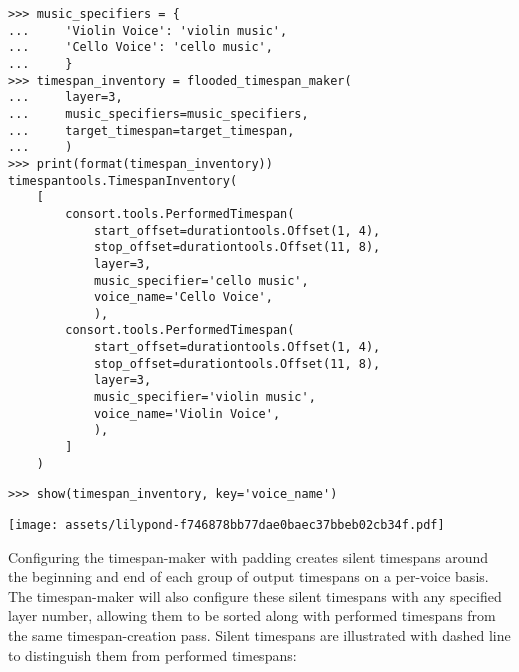\begin{singlespacing}
\vspace{-0.5\baselineskip}
\begin{lstlisting}
>>> music_specifiers = {
...     'Violin Voice': 'violin music',
...     'Cello Voice': 'cello music',
...     }
>>> timespan_inventory = flooded_timespan_maker(
...     layer=3,
...     music_specifiers=music_specifiers,
...     target_timespan=target_timespan,
...     )
>>> print(format(timespan_inventory))
timespantools.TimespanInventory(
    [
        consort.tools.PerformedTimespan(
            start_offset=durationtools.Offset(1, 4),
            stop_offset=durationtools.Offset(11, 8),
            layer=3,
            music_specifier='cello music',
            voice_name='Cello Voice',
            ),
        consort.tools.PerformedTimespan(
            start_offset=durationtools.Offset(1, 4),
            stop_offset=durationtools.Offset(11, 8),
            layer=3,
            music_specifier='violin music',
            voice_name='Violin Voice',
            ),
        ]
    )
\end{lstlisting}
\begin{lstlisting}
>>> show(timespan_inventory, key='voice_name')
\end{lstlisting}
\noindent\texttt{[image: assets/lilypond-f746878bb77dae0baec37bbeb02cb34f.pdf]}
\end{singlespacing}

\noindent Configuring the timespan-maker with padding creates silent timespans
around the beginning and end of each group of output timespans on a per-voice
basis. The timespan-maker will also configure these silent timespans with any
specified layer number, allowing them to be sorted along with performed
timespans from the same timespan-creation pass. Silent timespans are
illustrated with dashed line to distinguish them from performed timespans:

\begin{comment}
<abjad>
flooded_timespan_maker = consort.FloodedTimespanMaker(
    padding=Duration(1, 4),
    timespan_specifier=consort.TimespanSpecifier(
        minimum_duration=Duration(1, 8),
        ),
    )
timespan_inventory = flooded_timespan_maker(
    layer=5,
    music_specifiers=music_specifiers,
    target_timespan=target_timespan,
    )
print(format(timespan_inventory))
show(timespan_inventory, key='voice_name')
</abjad>
\end{comment}

